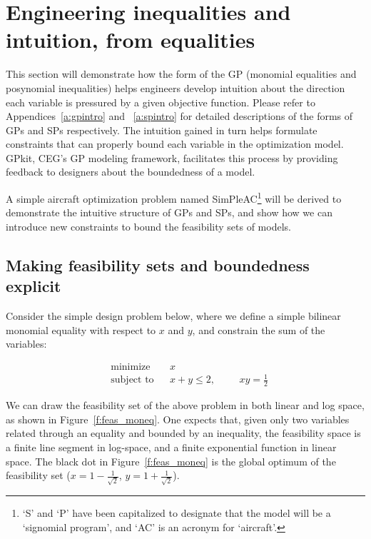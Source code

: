 \chapter{Engineering inequalities and intuition, from equalities}
\label{ch2:inequalities}

This section will demonstrate how the form of the \gls{GP} (monomial
equalities and posynomial inequalities) helps engineers develop intuition
about the direction each variable is pressured
by a given objective function. Please refer to Appendices~\ref{a:gpintro} and ~\ref{a:spintro}
for detailed descriptions of the forms of \gls{GP}s and \gls{SP}s respectively.
The intuition gained in turn helps formulate
constraints that can properly bound each variable in the optimization model.
GPkit, \gls{CEG}'s \gls{GP} modeling framework,
facilitates this process by providing feedback to designers about
the boundedness of a model.

A simple aircraft optimization problem named SimPleAC\footnote{`S' and `P' have been capitalized to designate that
the model will be a `signomial program', and `AC' is an acronym for `aircraft'.} will be derived to
demonstrate the intuitive structure of \gls{GP}s and \gls{SP}s, and show
how we can introduce new constraints to bound the feasibility sets of models.

\section{Making feasibility sets and boundedness explicit}

Consider the simple design problem below, where we define a simple bilinear
monomial equality with respect to $x$ and $y$, and constrain the sum of the variables:

\begin{equation*}
\begin{aligned}
& {\text{minimize}}
& & x \\
& \text{subject to}
& & x + y \leq 2,
    & & & xy = \frac{1}{2} \label{simple_moneq}
\end{aligned}
\end{equation*}

We can draw the feasibility set of the above problem in both linear and log space,
as shown in Figure~\ref{f:feas_moneq}. One expects that, given only two variables
related through an equality and bounded by an inequality, the feasibility space is
a finite line segment in log-space, and a finite exponential function in linear space.
The black dot in Figure~\ref{f:feas_moneq} is the global optimum of the feasibility set
($x = 1 - \frac{1}{\sqrt{2}}$, $y = 1 + \frac{1}{\sqrt{2}}$).

